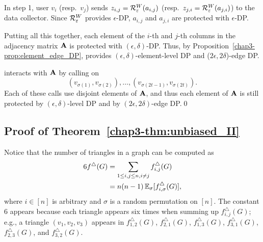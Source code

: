 In step 1, user $v_i$ (resp.~$v_j$) sends $z_{i,j} = \mathcal{R}_{\varepsilon}^W(a_{i,j})$ (resp.~$z_{j,i} = \mathcal{R}_{\varepsilon}^W(a_{j,i})$) to the data collector.
Since $\mathcal{R}_{\varepsilon}^W$ provides $\epsilon$-DP, $a_{i,j}$ and $a_{j,i}$ are protected with $\epsilon$-DP.

Putting all this together, each element of the $i$-th and $j$-th columns in the adjacency matrix $\mathbf{A}$ is protected with $(\epsilon, \delta)$-DP.
Thus, by Proposition~\ref{chap3-prop:element_edge_DP},
\AlgWSLE{}
provides $(\epsilon, \delta)$-element-level DP and ($2\epsilon, 2\delta$)-edge DP.

\AlgWSTri{} interacts with $\mathbf{A}$ by calling \AlgWSLE{} on \[(v_{\sigma(1)},
v_{\sigma(2)}), \ldots, (v_{\sigma(2t-1)}, v_{\sigma(2t)}).\] Each of these calls
use disjoint elements of $\mathbf{A}$, and thus each element of $\mathbf{A}$ is still
protected by $(\epsilon, \delta)$-level DP and by $(2\epsilon, 2\delta)$-edge
DP.\qed

\subsection{Proof of Theorem~\ref{chap3-thm:unbiased_II}}
\label{chap3-sub:unbiased_II_proof}
Notice that the number of triangles in a graph can be computed as
\begin{align}
  6f^\triangle(G) &= \sum_{1 \leq i,j \leq n, i\neq j} f^\triangle_{i,j}(G)
  \nonumber \\
  &= n(n-1) \operatorname{\mathbb{E}}_{\sigma}[f^\triangle_{i,
  \sigma}(G)],\label{chap3-eq:triangle-sample-est}
\end{align}
where $i \in [n]$ is arbitrary and $\sigma$ is a random permutation on
$[n]$. The constant $6$ appears because each triangle
appears six times when summing up $f^\triangle_{i,j}(G)$; e.g., a triangle $(v_1, v_2, v_3)$ appears in $f^\triangle_{1,2}(G)$, $f^\triangle_{2,1}(G)$,
$f^\triangle_{1,3}(G)$,
$f^\triangle_{3,1}(G)$,
$f^\triangle_{2,3}(G)$, and
$f^\triangle_{3,2}(G)$.

